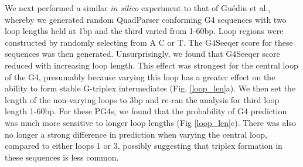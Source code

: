 \documentclass[12pt,a4paper,]{report}
\begin{document}
We next performed a similar \emph{in silico} experiment to that of
Guédin et al., whereby we generated random QuadParser conforming G4
sequences with two loop lengths held at 1bp and the third varied from
1-60bp. Loop regions were constructed by randomly selecting from A C or
T. The G4Seeqer score for these sequences was then generated.
Unsurprisingly, we found that G4Seeqer score reduced with increasing
loop length. This effect was strongest for the central loop of the G4,
presumably because varying this loop has a greater effect on the ability
to form stable G-triplex intermediates (Fig. \ref{loop_len}a). We then
set the length of the non-varying loops to 3bp and re-ran the analysis
for third loop length 1-60bp. For these PG4s, we found that the
probability of G4 prediction was much more sensitive to longer loop
lengths (Fig \ref{loop_len}c). There was also no longer a strong
difference in prediction when varying the central loop, compared to
either loops 1 or 3, possibly suggesting that triplex formation in these
sequences is less common.

\newpage
\end{document}
